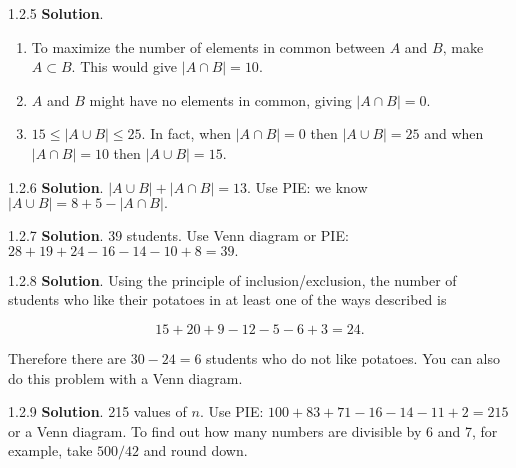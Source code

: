 \documentclass[11pt,]{book}
\theoremstyle{ptxplainnotitle}
\theoremstyle{ptxplaintitle}
\theoremstyle{ptxdefinitionnotitle}
\theoremstyle{ptxdefinitiontitle}
\theoremstyle{ptxdefinitionnotitle}
\theoremstyle{ptxdefinitiontitle}
\theoremstyle{ptxdefinitionnotitle}
\theoremstyle{ptxdefinitiontitle}
\theoremstyle{ptxdefinitiontitlenonumber}
\theoremstyle{ptxdefinitiontitlenonumber}
\numberwithin{equation}{chapter}
\newcommand{\card}[1]{\left| #1 \right|}
\begin{document}
\begin{divisionexercise}{1.2.5}
\textbf{Solution}.\quad%
\hypertarget{p-1173}{}%
\leavevmode%
\begin{enumerate}[label=\alph*.]
\item\hypertarget{li-510}{}\hypertarget{p-1174}{}%
To maximize the number of elements in common between \(A\) and \(B\text{,}\) make \(A \subset B\text{.}\)  This would give \(\card{A \cap B} = 10\text{.}\)%
\item\hypertarget{li-511}{}\hypertarget{p-1175}{}%
\(A\) and \(B\) might have no elements in common, giving \(\card{A\cap B} = 0\text{.}\)%
\item\hypertarget{li-512}{}\hypertarget{p-1176}{}%
\(15 \le \card{A \cup B} \le 25\text{.}\)  In fact, when \(\card{A \cap B} = 0\) then \(\card{A \cup B} = 25\) and when \(\card{A \cap B} = 10\) then \(\card{A \cup B} = 15\text{.}\)%
\end{enumerate}
%
\end{divisionexercise}%
\begin{divisionexercise}{1.2.6}
\textbf{Solution}.\quad%
\hypertarget{p-1182}{}%
\(\card{A \cup B} + \card{A \cap B} = 13\text{.}\)  Use PIE: we know \(\card{A \cup B} = 8 + 5 - \card{A \cap B}\text{.}\)%
\end{divisionexercise}%
\begin{divisionexercise}{1.2.7}
\textbf{Solution}.\quad%
\hypertarget{p-1188}{}%
39 students.  Use Venn diagram or PIE: \(28 + 19 + 24 - 16 - 14 - 10 + 8 = 39\text{.}\)%
\end{divisionexercise}%
\begin{divisionexercise}{1.2.8}
\textbf{Solution}.\quad%
\hypertarget{p-1195}{}%
Using the principle of inclusion/exclusion, the number of students who like their potatoes in at least one of the ways described is%
\par
\hypertarget{p-1196}{}%
%
\begin{equation*}
15 + 20 + 9 - 12 - 5 - 6 + 3 = 24.
\end{equation*}
%
\par
\hypertarget{p-1197}{}%
Therefore there are \(30-24 = 6\) students who do not like potatoes. You can also do this problem with a Venn diagram.%
\end{divisionexercise}%
\begin{divisionexercise}{1.2.9}
\textbf{Solution}.\quad%
\hypertarget{p-1205}{}%
215 values of \(n\text{.}\) Use PIE: \(100 + 83 + 71 - 16 - 14 -11 + 2 = 215\) or a Venn diagram. To find out how many numbers are divisible by 6 and 7, for example, take \(500/42\) and round down.%
\end{divisionexercise}%
\end{document}
